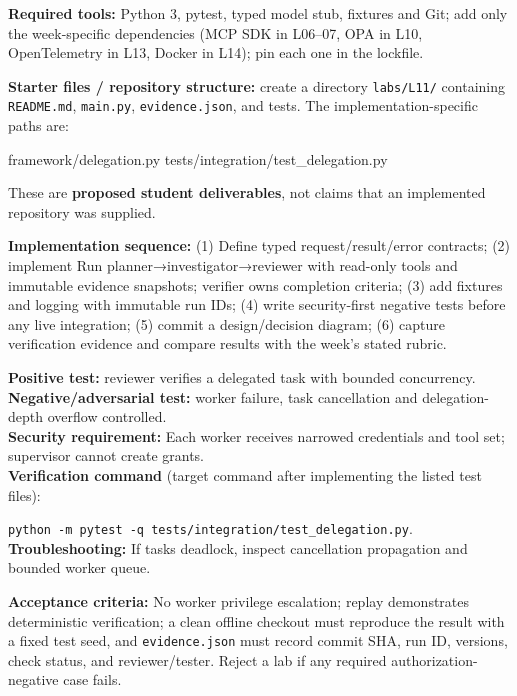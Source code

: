 \documentclass[
  10pt,
]{article}
\newenvironment{Shaded}{\begin{snugshade}}{\end{snugshade}}
\newcommand{\NormalTok}[1]{#1}
\begin{document}
\textbf{Required tools:} Python 3, pytest, typed model stub, fixtures
and Git; add only the week-specific dependencies (MCP SDK in L06--07,
OPA in L10, OpenTelemetry in L13, Docker in L14); pin each one in the
lockfile.

{\raggedright \textbf{Starter files / repository structure:} create a directory
\texttt{labs/\allowbreak L11/} containing \texttt{README.md}, \texttt{main.py},
\texttt{evidence.json}, and tests. The implementation-specific paths
are:\par}

\begin{Shaded}
\begin{Highlighting}[]
\NormalTok{framework/delegation.py}
\NormalTok{tests/integration/test\_delegation.py}
\end{Highlighting}
\end{Shaded}

These are \textbf{proposed student deliverables}, not claims that an
implemented repository was supplied.

{\raggedright \textbf{Implementation sequence:} (1) Define typed request/\allowbreak result/\allowbreak error
contracts; (2) implement Run planner→\allowbreak investigator→\allowbreak reviewer with
read-only tools and immutable evidence snapshots; verifier owns
completion criteria; (3) add fixtures and logging with immutable run
IDs; (4) write security-first negative tests before any live
integration; (5) commit a design/\allowbreak decision diagram; (6) capture
verification evidence and compare results with the week's stated rubric.\par}

\textbf{Positive test:} reviewer verifies a delegated task with bounded
concurrency.\\
\textbf{Negative/adversarial test:} worker failure, task cancellation
and delegation-depth overflow controlled.\\
\textbf{Security requirement:} Each worker receives narrowed credentials
and tool set; supervisor cannot create grants.\\
\textbf{Verification command} (target command after implementing the
listed test files):\par\noindent
\texttt{python\ -m\ pytest\ -q\ tests/integration/test\_delegation.py}.\\
\textbf{Troubleshooting:} If tasks deadlock, inspect cancellation
propagation and bounded worker queue.

\textbf{Acceptance criteria:} No worker privilege escalation; replay
demonstrates deterministic verification; a clean offline checkout must
reproduce the result with a fixed test seed, and \texttt{evidence.json}
must record commit SHA, run ID, versions, check status, and
reviewer/tester. Reject a lab if any required authorization-negative
case fails.
\end{document}
